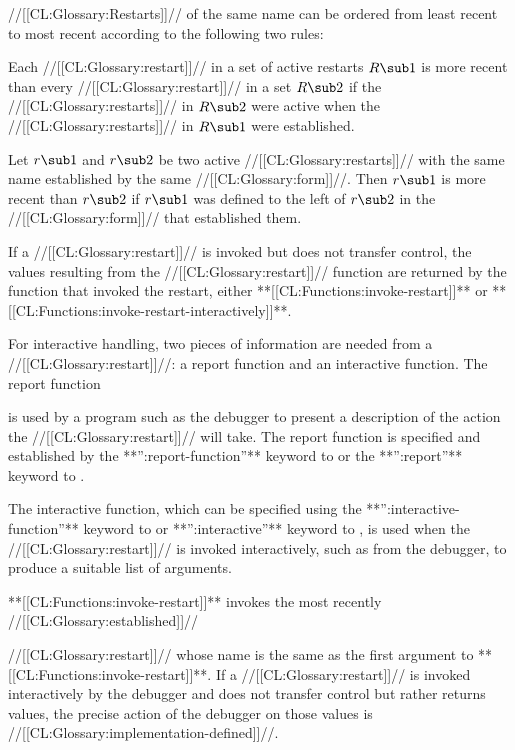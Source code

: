 //[[CL:Glossary:Restarts]]// of the same name can be ordered from least recent to most recent according to the following two rules:
  \beginlist
 
  Each //[[CL:Glossary:restart]]// in a set of active restarts $R\sub 1$ is more recent than every //[[CL:Glossary:restart]]// in a set $R\sub 2$ if the //[[CL:Glossary:restarts]]//  in $R\sub 2$ were active when the  //[[CL:Glossary:restarts]]// in $R\sub 1$ were established.
 
  Let $r\sub 1$ and $r\sub 2$ be two active //[[CL:Glossary:restarts]]// with the same name established by the same //[[CL:Glossary:form]]//. Then $r\sub 1$ is more recent than $r\sub 2$ if $r\sub 1$ was defined to the left of $r\sub 2$ in the //[[CL:Glossary:form]]// that established them.
  \endlist

If a //[[CL:Glossary:restart]]// is invoked but does not transfer control, the values resulting from the //[[CL:Glossary:restart]]// function are returned by the function that invoked the restart, either **[[CL:Functions:invoke-restart]]** or **[[CL:Functions:invoke-restart-interactively]]**.


  For interactive handling, two pieces of information are needed from a //[[CL:Glossary:restart]]//: a report function and an interactive function.
  The report function

is used by a program such as the debugger to present a description of the action the //[[CL:Glossary:restart]]// will take.   The report function is specified and established by the  **'':report-function''** keyword to  or the  **'':report''** keyword to . 

  The interactive function, which can be specified using the  **'':interactive-function''** keyword to   or **'':interactive''** keyword to , is used when the //[[CL:Glossary:restart]]// is invoked interactively, such as from the debugger, to produce a suitable list of arguments. 

  **[[CL:Functions:invoke-restart]]** invokes the most recently //[[CL:Glossary:established]]//

//[[CL:Glossary:restart]]// whose name is the same as the first argument to **[[CL:Functions:invoke-restart]]**. If a //[[CL:Glossary:restart]]// is invoked interactively by the debugger and  does not transfer control but rather returns values, the precise action of the debugger on those values is //[[CL:Glossary:implementation-defined]]//.

